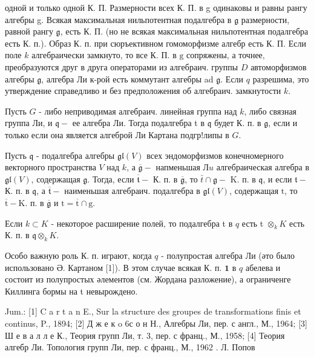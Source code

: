 \documentclass[10pt]{article}
\begin{document}
одной и только одной К. П. Размерности всех К. П. в g одинаковы и равны рангу алгебры g. Всякая максимальная нильпотентная подалгебра в $\mathfrak{g}$ размерности, равной рангу $\mathfrak{g}$, есть К. П. (но не всякая максимальная нильпотентная подалгебра есть К. п.). Образ К. п. при сюръективном гомоморфизме алгебр есть К. П. Если поле $k$ алгебраически замкнуто, то все К. П. в $\mathrm{g}$ сопряжены, а точнее, преобразуются друг в друга операторами из алгебраич. группы $D$ автоморфизмов алгебры $\mathfrak{g}$, алгебра Ли к-рой есть коммутант алгебры ad $\mathfrak{g}$. Если $q$ разрешима, это утверждение справедливо и без предположения об алгебраич. замкнутости $k$.



Пусть $G$ - либо неприводимая алгебраич. линейная группа над $k$, либо связная группа Ли, и $\mathfrak{q}-$ ее алгебра Ли. Тогда подалгебра t в $\mathfrak{q}$ будет К. п. в $\mathfrak{g}$, если и только если она является алгеброй Ли Картана подгр!липы в $G$.



Пусть $\mathfrak{q}$ - подалгебра алгебры $\mathfrak{g l}(V)$ всех эндоморфизмов конечномерного векторного пространства $V$ над $k$, а $\overline{\mathfrak{g}}-$ напменьшая $Л u$ алгебраическая алгебра в $\mathfrak{g l}(V)$, содержащая $\mathfrak{g}$. Тогда, если $\overline{\mathfrak{t}}-$ К. п. в $\overline{\mathfrak{g}}$, то $\bar{t} \cap \mathfrak{g}-$ K. п. в $\mathfrak{q}$, и если $\mathfrak{t}-$ К. п. в $\mathfrak{q}$, а $\overline{\mathfrak{t}}-$ наименьшая алгебраич. подалгебра в $\mathfrak{g l}(V)$, содержащая $\mathrm{t}$, то $\overline{\mathrm{t}}-\mathrm{K}$. п. в $\overline{\mathfrak{g}}$ и $\mathrm{t}=\overline{\mathrm{t}} \cap \mathfrak{\mathrm { g }}$.



Если $k \subset K$ - некоторое расширение полей, то подалгебра t в $q$ есть t $\otimes_{k} K$ есть К. п. в $\mathfrak{q} \otimes_{k} K$.



Особо важную роль К. п. играют, когда $q$ - полупростая алгебра Ли (әто было использовано Ә. Картаном [1]). В этом случае всякая К. п. $\mathbf{1}$ в $q$ абелева и состоит из полупростых әлементов (см. Жордана разложение), а ограниченге Киллинга бормы на t невырождено.



Jum.: [1] C a r t a n E., Sur la structure des groupes de transformations finis et continus, P., 1894; [2] Д ж е к o 6с о н Н., Алгебры Ли, пер. с англ., М., 1964; [3] Ш е в а л л е К., Теория групп Ли, т. 3, пер. с франц., М., 1958; [4] Теория алгебр Ли. Топология групп Ли, пер. с франц., М., 1962 . Л. Попов
\end{document}
